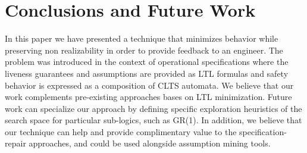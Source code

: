 \section{Conclusions and Future Work}
In this paper we have presented a technique that minimizes behavior while
preserving non realizability in order to provide feedback to an engineer.
The problem was introduced in the context of operational specifications where
the liveness guarantees and assumptions are provided as LTL formulas and safety behavior
is expressed as a composition of CLTS automata.  %
We believe that our work complements pre-existing approaches bases on LTL minimization. 
Future work can specialize
our approach by defining specific exploration heuristics of the search space for particular sub-logics, such as GR(1).  
In addition, we believe that our technique can help and provide complimentary value to the
specification-repair approaches, and could be used alongside assumption mining
tools.

